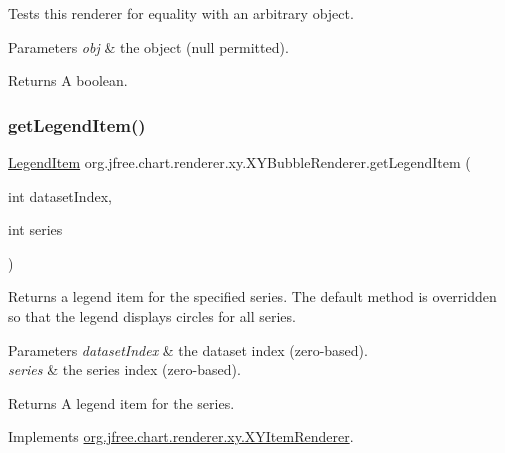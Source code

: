 Tests this renderer for equality with an arbitrary object.


\begin{DoxyParams}{Parameters}
{\em obj} & the object ({\ttfamily null} permitted).\\
\hline
\end{DoxyParams}
\begin{DoxyReturn}{Returns}
A boolean. 
\end{DoxyReturn}
\mbox{\label{classorg_1_1jfree_1_1chart_1_1renderer_1_1xy_1_1_x_y_bubble_renderer_a11dba708aad07635e92cfaa179d259c2}} 
\subsubsection{\texorpdfstring{get\+Legend\+Item()}{getLegendItem()}}
{\footnotesize\ttfamily \mbox{\hyperlink{classorg_1_1jfree_1_1chart_1_1_legend_item}{Legend\+Item}} org.\+jfree.\+chart.\+renderer.\+xy.\+X\+Y\+Bubble\+Renderer.\+get\+Legend\+Item (\begin{DoxyParamCaption}\item[{int}]{dataset\+Index,  }\item[{int}]{series }\end{DoxyParamCaption})}

Returns a legend item for the specified series. The default method is overridden so that the legend displays circles for all series.


\begin{DoxyParams}{Parameters}
{\em dataset\+Index} & the dataset index (zero-\/based). \\
\hline
{\em series} & the series index (zero-\/based).\\
\hline
\end{DoxyParams}
\begin{DoxyReturn}{Returns}
A legend item for the series. 
\end{DoxyReturn}


Implements \mbox{\hyperlink{interfaceorg_1_1jfree_1_1chart_1_1renderer_1_1xy_1_1_x_y_item_renderer_a792c3e8c39bf57711528cd8064d2ddb5}{org.\+jfree.\+chart.\+renderer.\+xy.\+X\+Y\+Item\+Renderer}}.


